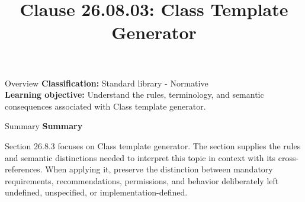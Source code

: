 \documentclass[10pt,letterpaper]{article}
\title{Clause 26.08.03: Class Template Generator}
\author{}
\date{}
\begin{document}
\maketitle
\begin{CornellOverviewBox}{Overview}
\textbf{Classification:} Standard library - Normative\\[2pt]
\textbf{Learning objective:} Understand the rules, terminology, and semantic consequences associated with Class template generator.
\end{CornellOverviewBox}\begin{CornellSummaryBox}{Summary}
{\sffamily\bfseries\color{Accent} Summary}\par\vspace{3pt}Section 26.8.3 focuses on Class template generator. The section supplies the rules and semantic distinctions needed to interpret this topic in context with its cross-references. When applying it, preserve the distinction between mandatory requirements, recommendations, permissions, and behavior deliberately left undefined, unspecified, or implementation-defined.
\end{CornellSummaryBox}
\end{document}
